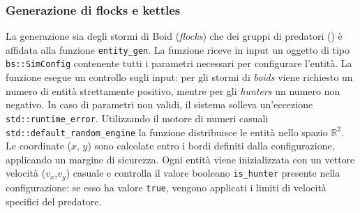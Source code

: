 \documentclass[11pt, a4paper]{article}
\begin{document}
\subsubsection{Generazione di flocks e kettles}
La generazione sia degli stormi di Boid (\textit{flocks}) che dei gruppi di predatori () è affidata alla funzione \texttt{entity\_gen}. La funzione riceve in input un oggetto di tipo \texttt{bs::SimConfig} contenente tutti i parametri necessari per configurare l'entità. La funzione esegue un controllo sugli input: per gli stormi di \textit{boids} viene richiesto un numero di entità strettamente positivo, mentre per gli \textit{hunters} un numero non negativo. In caso di parametri non validi, il sistema solleva un'eccezione \texttt{std::runtime\_error}.
Utilizzando il motore di numeri casuali \texttt{std::default\_random\_engine} la funzione distribuisce le entità nello spazio $\mathbb{R}^2$. Le coordinate ($x$, $y$) sono calcolate entro i bordi definiti dalla configurazione, applicando un margine di sicurezza. Ogni entità viene inizializzata con un vettore velocità ($v_x$,$v_y$) casuale e controlla il valore booleano \texttt{is\_hunter} presente nella configurazione: se esso ha valore \texttt{true}, vengono applicati i limiti di velocità specifici del predatore.
\end{document}
